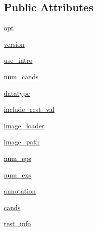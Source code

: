 \subsection*{Public Attributes}
\begin{DoxyCompactItemize}
\item 
\hyperlink{classparlai_1_1tasks_1_1coco__caption_1_1agents_1_1DefaultDataset_adaa89b61b63ef4c1291774fda7abaf3c}{opt}
\item 
\hyperlink{classparlai_1_1tasks_1_1coco__caption_1_1agents_1_1DefaultDataset_a3f8225c248c5b7f8ccf67aeae46321fc}{version}
\item 
\hyperlink{classparlai_1_1tasks_1_1coco__caption_1_1agents_1_1DefaultDataset_a4ea15a073ab9a7e601922ecbb44ded4b}{use\+\_\+intro}
\item 
\hyperlink{classparlai_1_1tasks_1_1coco__caption_1_1agents_1_1DefaultDataset_ab44398b6f910aaed1429a8f0ae3791d4}{num\+\_\+cands}
\item 
\hyperlink{classparlai_1_1tasks_1_1coco__caption_1_1agents_1_1DefaultDataset_a514660f6547b29a70d05eb6da8fa8412}{datatype}
\item 
\hyperlink{classparlai_1_1tasks_1_1coco__caption_1_1agents_1_1DefaultDataset_a2123598b482bd8eabd49d6bdb178c1ed}{include\+\_\+rest\+\_\+val}
\item 
\hyperlink{classparlai_1_1tasks_1_1coco__caption_1_1agents_1_1DefaultDataset_a3cec7479cdb18616f1e50ac8b714ea69}{image\+\_\+loader}
\item 
\hyperlink{classparlai_1_1tasks_1_1coco__caption_1_1agents_1_1DefaultDataset_a6d14a4869069e29159a5f315efac0207}{image\+\_\+path}
\item 
\hyperlink{classparlai_1_1tasks_1_1coco__caption_1_1agents_1_1DefaultDataset_a462ef75e6b3c527a476d8f76321276a1}{num\+\_\+eps}
\item 
\hyperlink{classparlai_1_1tasks_1_1coco__caption_1_1agents_1_1DefaultDataset_a288a755d6c7400a08f4db1a4ed6b3bbc}{num\+\_\+exs}
\item 
\hyperlink{classparlai_1_1tasks_1_1coco__caption_1_1agents_1_1DefaultDataset_a6b5c2f828b4b8f8e625f691123338739}{annotation}
\item 
\hyperlink{classparlai_1_1tasks_1_1coco__caption_1_1agents_1_1DefaultDataset_a229275685a80b202055a91072dd982f2}{cands}
\item 
\hyperlink{classparlai_1_1tasks_1_1coco__caption_1_1agents_1_1DefaultDataset_ad68b4e554b8e898aaeec7b2ae55d665f}{test\+\_\+info}
\end{DoxyCompactItemize}


